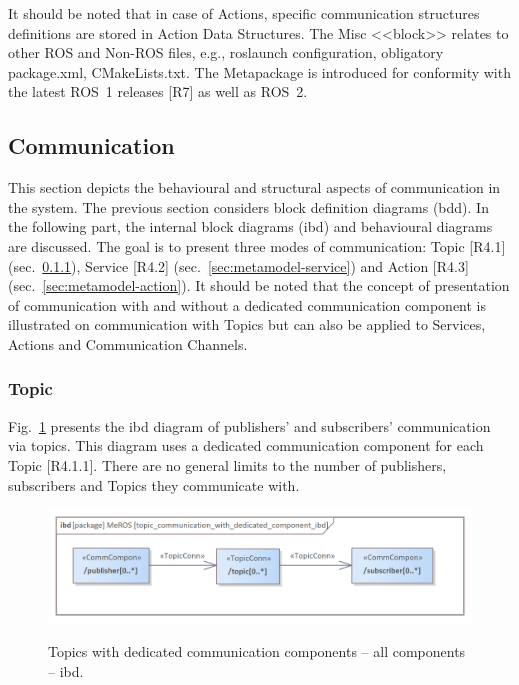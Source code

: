 \documentclass[11pt,oneside,a4paper]{article}
\begin{document}
	It should be noted that in case of Actions, specific communication structures definitions are stored in Action Data Structures. The Misc <<block>> relates to other ROS and Non-ROS files, e.g., roslaunch configuration, obligatory package.xml, CMakeLists.txt. The Metapackage is introduced for conformity with the latest ROS~1 releases [R7] as well as ROS~2. 
		

	
	
	
\subsection{Communication}
\label{sec:metamodel-communication}
	
	This section depicts the behavioural and structural aspects of communication in the system. The previous section considers block definition diagrams (bdd). In the following part, the internal block diagrams (ibd) and behavioural diagrams are discussed. The goal is to present three modes of communication: Topic [R4.1] (sec.~\ref{sec:metamodel-topic}), Service [R4.2] (sec.~\ref{sec:metamodel-service}) and Action [R4.3] (sec.~\ref{sec:metamodel-action}). It should be noted that the concept of presentation of communication with and without a dedicated communication component is illustrated on communication with Topics but can also be applied to Services, Actions and Communication Channels.
	
	
	\pagebreak
	
	\subsubsection{Topic}
	\label{sec:metamodel-topic}
		
	Fig.~\ref{fig:topic_communication_with_dedicated_component_ibd} presents the ibd diagram of publishers' and subscribers' communication via topics. This diagram uses a dedicated communication component for each Topic [R4.1.1]. There are no general limits to the number of publishers, subscribers and Topics they communicate with. 
	

	\begin{figure}[H]
		\centering
		\begin{center}
			{\includegraphics[scale=1.0]{img/meros_pkg/topic_communication_with_dedicated_component_ibd.png}}
		\end{center}
		\caption{Topics with dedicated communication components -- all components -- ibd.} 
		\label{fig:topic_communication_with_dedicated_component_ibd}
	\end{figure}
\end{document}

